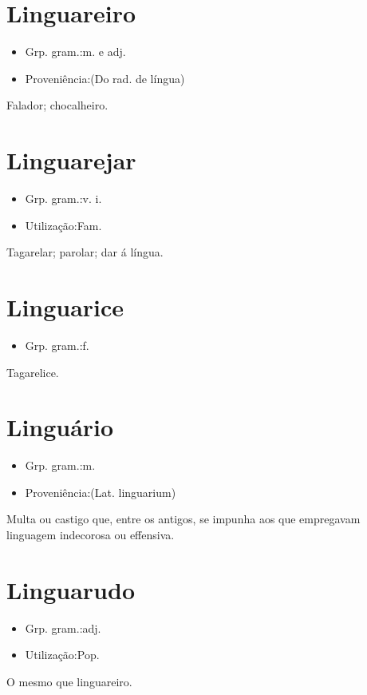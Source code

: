 \section{Linguareiro}
\begin{itemize}
\item {Grp. gram.:m.  e  adj.}
\end{itemize}
\begin{itemize}
\item {Proveniência:(Do rad. de \textunderscore língua\textunderscore )}
\end{itemize}
Falador; chocalheiro.
\section{Linguarejar}
\begin{itemize}
\item {Grp. gram.:v. i.}
\end{itemize}
\begin{itemize}
\item {Utilização:Fam.}
\end{itemize}
Tagarelar; parolar; dar á língua.
\section{Linguarice}
\begin{itemize}
\item {Grp. gram.:f.}
\end{itemize}
Tagarelice.
\section{Linguário}
\begin{itemize}
\item {Grp. gram.:m.}
\end{itemize}
\begin{itemize}
\item {Proveniência:(Lat. \textunderscore linguarium\textunderscore )}
\end{itemize}
Multa ou castigo que, entre os antigos, se impunha aos que empregavam linguagem indecorosa ou effensiva.
\section{Linguarudo}
\begin{itemize}
\item {Grp. gram.:adj.}
\end{itemize}
\begin{itemize}
\item {Utilização:Pop.}
\end{itemize}
O mesmo que \textunderscore linguareiro\textunderscore .
